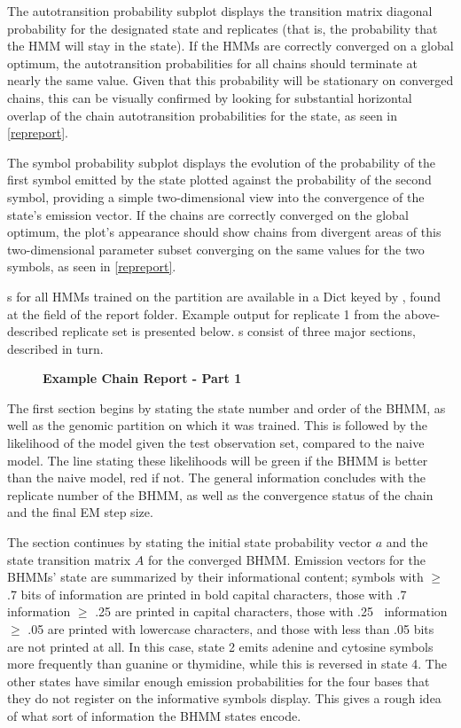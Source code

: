 The autotransition probability subplot displays the transition matrix diagonal probability for the designated state and replicates (that is, the probability that the HMM will stay in the state). If the HMMs are correctly converged on a global optimum, the autotransition probabilities for all chains should terminate at nearly the same value. Given that this probability will be stationary on converged chains, this can be visually confirmed by looking for substantial horizontal overlap of the chain autotransition probabilities for the state, as seen in \autoref{repreport}.

The symbol probability subplot displays the evolution of the probability of the first symbol emitted by the state plotted against the probability of the second symbol, providing a simple two-dimensional view into the convergence of the state's emission vector. If the chains are correctly converged on the global optimum, the plot's appearance should show chains from divergent areas of this two-dimensional parameter subset converging on the same values for the two symbols, as seen in \autoref{repreport}.

s for all HMMs trained on the partition are available in a Dict keyed by , found at the  field of the report folder. Example output for replicate 1 from the above-described replicate set is presented below. s consist of three major sections, described in turn.

\begin{figure}[!h]
    \caption{{\bf Example \protect{} Chain Report - Part 1}}
    \label{chreport1}
\end{figure}

The first  section begins by stating the state number and order of the BHMM, as well as the genomic partition on which it was trained. This is followed by the likelihood of the model given the test observation set, compared to the naive model. The line stating these likelihoods will be green if the BHMM is better than the naive model, red if not. The general information concludes with the replicate number of the BHMM, as well as the convergence status of the chain and the final EM step size.

The section continues by stating the initial state probability vector $a$ and the state transition matrix $A$ for the converged BHMM. Emission vectors for the BHMMs' state are summarized by their informational content; symbols with $\geq$ .7 bits of information are printed in bold capital characters, those with .7 $\>$ information $\geq$ .25 are printed in capital characters, those with .25 $\>$ information $\geq$ .05 are printed with lowercase characters, and those with less than .05 bits are not printed at all. In this case, state 2 emits adenine and cytosine symbols more frequently than guanine or thymidine, while this is reversed in state 4. The other states have similar enough emission probabilities for the four bases that they do not register on the informative symbols display. This gives a rough idea of what sort of information the BHMM states encode.

